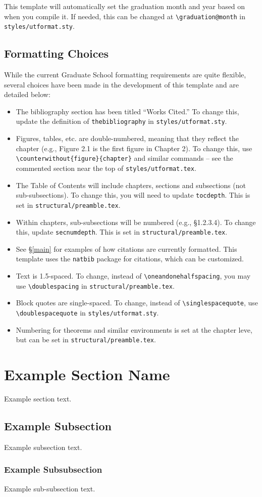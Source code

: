 This template will automatically set the graduation month and year based on when you compile it. If needed, this can be changed at \verb|\graduation@month| in \verb|styles/utformat.sty|.

\subsection{Formatting Choices}
While the current Graduate School formatting requirements are quite flexible, several choices have been made in the development of this template and are detailed below:
\begin{itemize}
    \item The bibliography section has been titled ``Works Cited.'' To change this, update the definition of \verb|thebibliography| in \verb|styles/utformat.sty|.
    \item Figures, tables, etc. are double-numbered, meaning that they reflect the chapter (e.g., Figure 2.1 is the first figure in Chapter 2). To change this, use \verb|\counterwithout{figure}{chapter}| and similar commands -- see the commented section near the top of \verb|styles/utformat.tex|.
    \item The Table of Contents will include chapters, sections and subsections (not sub-subsections). To change this, you will need to update \verb|tocdepth|. This is set in \verb|structural/preamble.tex|.
    \item Within chapters, sub-subsections will be numbered (e.g., \S1.2.3.4). To change this, update \verb|secnumdepth|. This is set in \verb|structural/preamble.tex|.
    \item See \S\ref{main} for examples of how citations are currently formatted. This template uses the \verb|natbib| package for citations, which can be customized.
    \item Text is 1.5-spaced. To change, instead of \verb|\oneandonehalfspacing|, you may use \verb|\doublespacing| in \verb|structural/preamble.tex|.
    \item Block quotes are single-spaced. To change, instead of \verb|\singlespacequote|, use \verb|\doublespacequote| in \verb|styles/utformat.sty|.
    \item Numbering for theorems and similar environments is set at the chapter leve, but can be set in \verb|structural/preamble.tex|.
\end{itemize}


\section{Example Section Name}
Example section text.

\subsection{Example Subsection}
Example subsection text.

\subsubsection{Example Subsubsection}
Example sub-subsection text.
